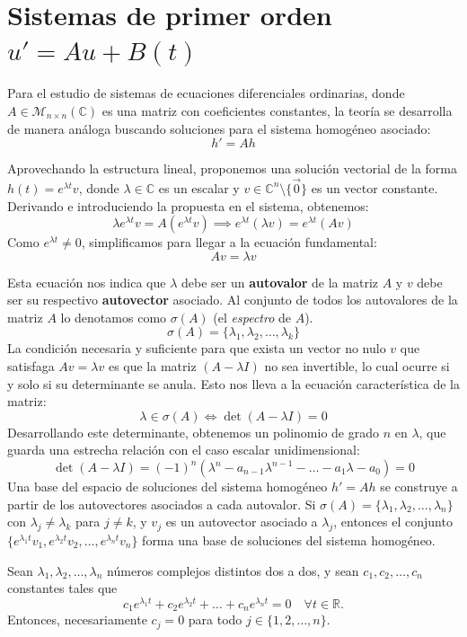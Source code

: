 \section{Sistemas de primer orden $u' = Au + B(t)$}

Para el estudio de sistemas de ecuaciones diferenciales ordinarias, donde $A \in \mathcal{M}_{n \times n}(\mathbb{C})$ es una matriz con coeficientes constantes, la teoría se desarrolla de manera análoga buscando soluciones para el sistema homogéneo asociado:
\[
    h' = Ah
\]

Aprovechando la estructura lineal, proponemos una solución vectorial de la forma $h(t) = e^{\lambda t}v$, donde $\lambda \in \mathbb{C}$ es un escalar y $v \in \mathbb{C}^n \setminus \{\vec{0}\}$ es un vector constante.
Derivando e introduciendo la propuesta en el sistema, obtenemos:
\[
    \lambda e^{\lambda t} v = A (e^{\lambda t} v) \implies e^{\lambda t} (\lambda v) = e^{\lambda t} (Av)
\]
Como $e^{\lambda t} \neq 0$, simplificamos para llegar a la ecuación fundamental:
\[
    Av = \lambda v
\]

Esta ecuación nos indica que $\lambda$ debe ser un \textbf{autovalor} de la matriz $A$ y $v$ debe ser su respectivo \textbf{autovector} asociado. Al conjunto de todos los autovalores de la matriz $A$ lo denotamos como $\sigma(A)$ (el \textit{espectro} de $A$).
\[
    \sigma(A) = \{\lambda_1, \lambda_2, \dots, \lambda_k\}
\]
La condición necesaria y suficiente para que exista un vector no nulo $v$ que satisfaga $Av = \lambda v$ es que la matriz $(A - \lambda I)$ no sea invertible, lo cual ocurre si y solo si su determinante se anula. Esto nos lleva a la ecuación característica de la matriz:
\[
    \lambda \in \sigma(A) \iff \det(A - \lambda I) = 0
\]
Desarrollando este determinante, obtenemos un polinomio de grado $n$ en $\lambda$, que guarda una estrecha relación con el caso escalar unidimensional:
\[
    \det(A - \lambda I) = (-1)^n \left( \lambda^n - a_{n-1} \lambda^{n-1} - \dots - a_1 \lambda - a_0 \right) = 0
\]
Una base del espacio de soluciones del sistema homogéneo $h' = Ah$ se construye a partir de los autovectores asociados a cada autovalor. Si $\sigma(A) = \{\lambda_1, \lambda_2, \dots, \lambda_n\}$ con $\lambda_j \neq \lambda_k$ para $j \neq k$, y $v_j$ es un autovector asociado a $\lambda_j$, entonces el conjunto $\{e^{\lambda_1 t} v_1, e^{\lambda_2 t} v_2, \dots, e^{\lambda_n t} v_n\}$ forma una base de soluciones del sistema homogéneo.
\begin{lema}
    Sean $\lambda_1, \lambda_2, \dots, \lambda_n$ números complejos distintos dos a dos, y sean $c_1, c_2, \dots, c_n$ constantes tales que 
    \[
        c_1 e^{\lambda_1 t} + c_2 e^{\lambda_2 t} + \dots + c_n e^{\lambda_n t} = 0 \quad \forall t \in \mathbb{R}.
    \]
    Entonces, necesariamente $c_j = 0$ para todo $j \in \{1, 2, \dots, n\}$.
\end{lema}

